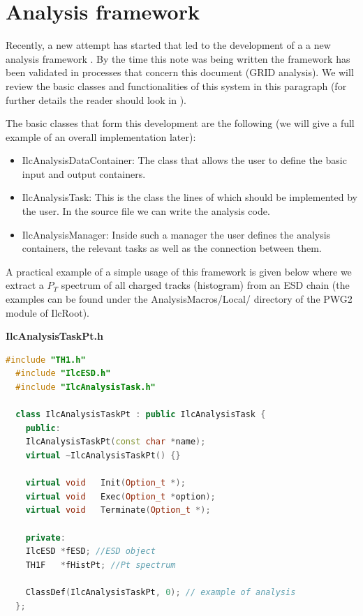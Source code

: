 \section{Analysis framework}
\label{Note:ANALYSIS}

Recently, a new attempt has started that led to the development of a a new analysis framework \cite{Note:RefAnalysisFramework}. By the time this note was being written the framework has been validated in processes that concern this document (GRID analysis). We will review the basic classes and functionalities of this system in this paragraph (for further details the reader should look in \cite{Note:RefAnalysisFramework,Note:RefIlcenTutorial}).

The basic classes that form this development are the following (we will give a full example of an overall implementation later):

\begin{itemize}
\item {\ttfamily IlcAnalysisDataContainer:} The class that allows the user to define the basic input and output containers.
\item {\ttfamily IlcAnalysisTask:} This is the class the lines of which should be implemented by the user. In the source file we can write the analysis code. 
\item {\ttfamily IlcAnalysisManager:} Inside such a manager the user defines the analysis containers, the relevant tasks as well as the connection between them.
\end{itemize}

A practical example of a simple usage of this framework is given below where we extract a $P_{T}$ spectrum of all charged tracks (histogram) from an ESD chain (the examples can be found under the AnalysisMacros/Local/ directory of the PWG2 module of IlcRoot).

\vspace{0.5 cm}
\textbf{IlcAnalysisTaskPt.h}
\begin{lstlisting}[language=C++]
  #include "TH1.h"
  #include "IlcESD.h"
  #include "IlcAnalysisTask.h"

  class IlcAnalysisTaskPt : public IlcAnalysisTask {
    public:
    IlcAnalysisTaskPt(const char *name);
    virtual ~IlcAnalysisTaskPt() {}
    
    virtual void   Init(Option_t *);
    virtual void   Exec(Option_t *option);
    virtual void   Terminate(Option_t *);
    
    private:
    IlcESD *fESD; //ESD object
    TH1F   *fHistPt; //Pt spectrum
    
    ClassDef(IlcAnalysisTaskPt, 0); // example of analysis
  };
\end{lstlisting}

